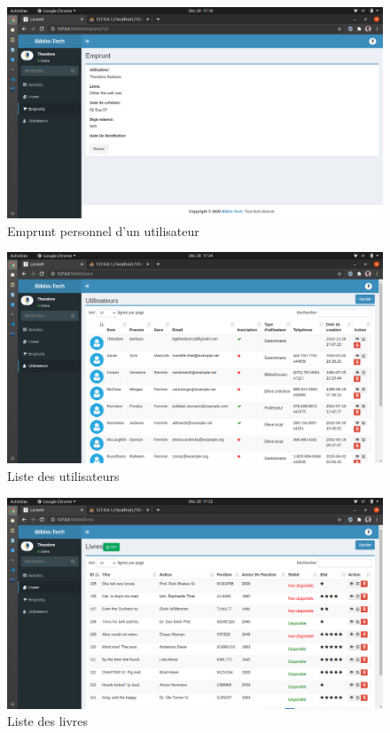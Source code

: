 \begin{figure}[h]
    \centering
    \includegraphics[width=1\textwidth]{emprunt_personnel}
    \caption{Emprunt personnel d'un utilisateur}
    \label{image-emprunt_personnel}
\end{figure}

\begin{figure}[h]
    \centering
    \includegraphics[width=1\textwidth]{liste_utilisateur}
    \caption{Liste des utilisateurs}
    \label{image-liste_utilisateur}
\end{figure}

\begin{figure}[h]
    \centering
    \includegraphics[width=1\textwidth]{liste_livres}
    \caption{Liste des livres}
    \label{image-liste_livres}
\end{figure}

